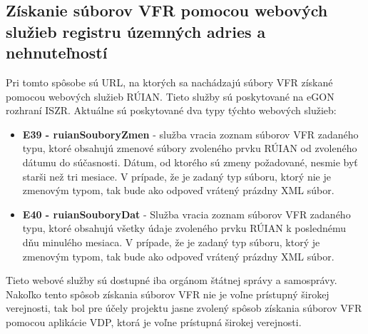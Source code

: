 \subsection {Získanie súborov VFR pomocou webových služieb registru územných adries a nehnuteľností}
Pri tomto spôsobe sú URL, na ktorých sa nachádzajú súbory VFR získané pomocou webových služieb RÚIAN. Tieto služby sú poskytované na eGON rozhraní ISZR. Aktuálne sú poskytované dva typy týchto webových služieb: 
\begin{itemize}
\item{{\bf E39 -  ruianSouboryZmen} - služba vracia zoznam súborov VFR zadaného typu, ktoré obsahujú zmenové súbory zvoleného prvku RÚIAN od zvoleného dátumu do súčasnosti. Dátum, od ktorého sú zmeny požadované, nesmie byť starši než tri mesiace. V prípade, že je zadaný typ súboru, ktorý nie je zmenovým typom, tak bude ako odpoveď vrátený prázdny XML súbor.
}
\item{{\bf E40 - ruianSouboryDat} - Služba vracia zoznam súborov VFR zadaného typu, ktoré obsahujú všetky údaje zvoleného prvku RÚIAN k poslednému dňu minulého mesiaca. V prípade, že je zadaný typ súboru, ktorý je zmenovým typom, tak bude ako odpoveď vrátený prázdny XML súbor.}
\end{itemize}
Tieto webové služby sú dostupné iba orgánom štátnej správy a samosprávy. Nakoľko tento spôsob získania súborov VFR nie je voľne prístupný širokej verejnosti, tak bol pre účely projektu jasne zvolený spôsob získania súborov VFR pomocou aplikácie VDP, ktorá je voľne prístupná širokej verejnosti.
